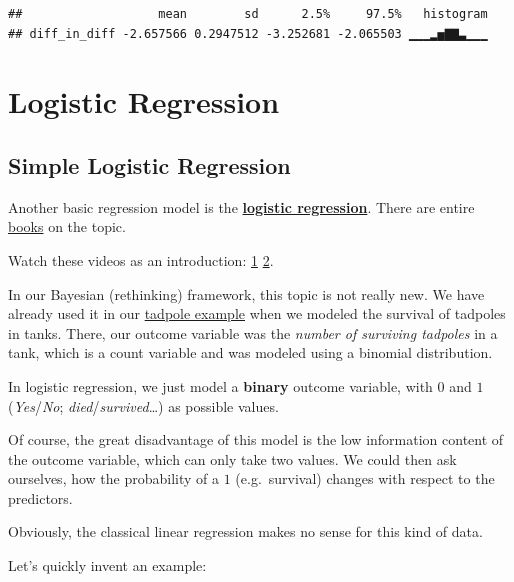 \documentclass[
]{book}
\begin{document}
\begin{verbatim}
##                   mean        sd      2.5%     97.5%   histogram
## diff_in_diff -2.657566 0.2947512 -3.252681 -2.065503 ▁▁▁▂▅▇▇▃▁▁▁
\end{verbatim}

\section{Logistic Regression}\label{logistic_regression}

\subsection{Simple Logistic Regression}\label{simple_logistic_regression}

Another basic regression model is the \href{https://en.wikipedia.org/wiki/Logistic_regression}{\textbf{logistic regression}}.
There are entire \href{https://onlinelibrary.wiley.com/doi/book/10.1002/9781118548387}{books} on the topic.

Watch these videos as an introduction:
\href{https://www.youtube.com/watch?v=yIYKR4sgzI8&ab_channel=StatQuestwithJoshStarmer}{1}
\href{https://www.youtube.com/watch?v=Iju8l2qgaJU&t=330s&ab_channel=VeryNormal}{2}.

In our Bayesian (rethinking) framework, this topic is not really new.
We have already used it in our \href{https://jdegenfellner.github.io/Script_QM3_ZHAW/further-regression-methods.html\#model13_1}{tadpole example}
when we modeled the survival of tadpoles in tanks.
There, our outcome variable was the \emph{number of surviving tadpoles} in a tank,
which is a count variable and was modeled using a binomial distribution.

In logistic regression, we just model a \textbf{binary} outcome variable,
with \(0\) and \(1\) (\emph{Yes}/\emph{No}; \emph{died}/\emph{survived}\ldots) as possible values.

Of course, the great disadvantage of this model is the low
information content of the outcome variable,
which can only take two values. We could then ask ourselves,
how the probability of a \(1\) (e.g.~survival) changes with respect to the predictors.

Obviously, the classical linear regression makes no sense for this kind of data.

Let's quickly invent an example:
\end{document}

